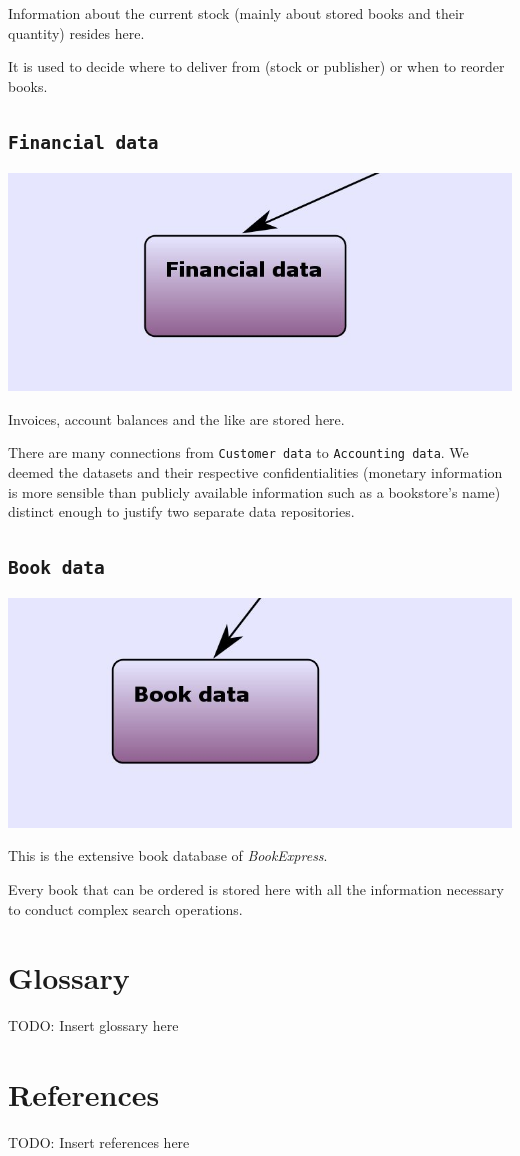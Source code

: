Information about the current stock (mainly about stored books and their quantity) resides here.

It is used to decide where to deliver from (stock or publisher) or when to reorder books.


\section{\texttt{Financial data}}

\includegraphics[scale=0.8]{screenshots/Financial_data.jpeg}

Invoices, account balances and the like are stored here.

There are many connections from \texttt{Customer data} to \texttt{Accounting data}. We deemed the datasets and their respective confidentialities (monetary
information is more sensible than publicly available information such as a bookstore's name) distinct enough to justify two separate data repositories.


\section{\texttt{Book data}}

\includegraphics[scale=0.8]{screenshots/Book_data.jpeg}

This is the extensive book database of \emph{BookExpress}.

Every book that can be ordered is stored here with all the information necessary to conduct complex search operations.


\newpage
\begin{appendix}
\chapter{Glossary}
TODO: Insert glossary here
\chapter{References}
TODO: Insert references here
\end{appendix}



